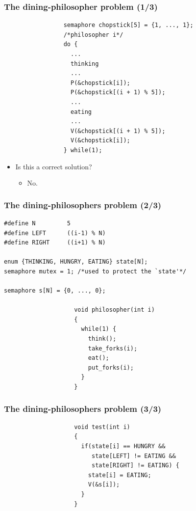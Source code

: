 \documentclass[CJKutf8,xcolor=pdftex,dvipsnames,table]{beamer}
\begin{document}
\begin{CJK*}{UTF8}{song}
  \begin{frame}[fragile]
  \frametitle{The dining-philosopher problem (1/3)} \pause

\begin{lstlisting}
                 semaphore chopstick[5] = {1, ..., 1};
                 /*philosopher i*/
                 do {
                   ...
                   thinking
                   ...
                   P(&chopstick[i]);
                   P(&chopstick[(i + 1) % 5]);
                   ...
                   eating
                   ...
                   V(&chopstick[(i + 1) % 5]);
                   V(&chopstick[i]);
                 } while(1);
\end{lstlisting}

  \pause

  \begin{itemize}
  \item{Is this a correct solution?} \pause
    \begin{itemize}
    \item{No.}
    \end{itemize}
  \end{itemize}
\end{frame}

  \begin{frame}[fragile]
  \frametitle{The dining-philosophers problem (2/3)} \pause

\begin{lstlisting}
#define N         5
#define LEFT      ((i-1) % N)
#define RIGHT     ((i+1) % N)

enum {THINKING, HUNGRY, EATING} state[N];
semaphore mutex = 1; /*used to protect the `state'*/

semaphore s[N] = {0, ..., 0};

                    void philosopher(int i)
                    {
                      while(1) {
                        think();
                        take_forks(i);
                        eat();
                        put_forks(i);
                      }
                    }
\end{lstlisting}

\end{frame}

  \begin{frame}[fragile]
  \frametitle{The dining-philosophers problem (3/3)} \pause

\begin{lstlisting}
                    void test(int i)
                    {
                      if(state[i] == HUNGRY &&
                         state[LEFT] != EATING &&
                         state[RIGHT] != EATING) {
                        state[i] = EATING;
                        V(&s[i]);
                      }
                    }
\end{lstlisting}


\end{frame}
\end{CJK*}
\end{document}

